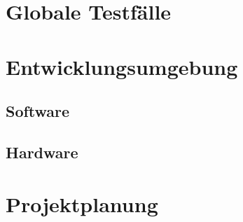 \documentclass[a4paper,12pt]{scrreprt}
\begin{document}
	
	
\chapter{Globale Testfälle}
	
	
	
\chapter{Entwicklungsumgebung}
	
	\section{Software}
		
		
		
	\section{Hardware}
		
		
		
\chapter{Projektplanung}



	
	
\end{document}
